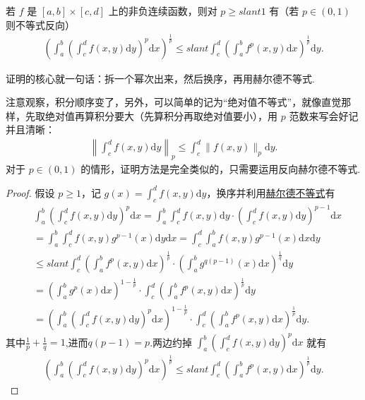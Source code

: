 \documentclass[../../main.tex]{subfiles}
\begin{document}
\begin{theorem}[Minkowski不等式]\label{theorem:Minkowski(闵可夫斯基)不等式}
若 $f$ 是 $[a,b] \times [c,d]$ 上的非负连续函数，则对 $p \geqslant slant 1$ 有（若 $p \in (0,1)$ 则不等式反向）
\begin{align*}
\left( \int_a^b \left( \int_c^d f(x,y) \mathrm{d}y \right)^p \mathrm{d}x \right)^{\frac{1}{p}} \leqslant slant \int_c^d \left( \int_a^b f^p(x,y) \mathrm{d}x \right)^{\frac{1}{p}} \mathrm{d}y.
\end{align*}
\end{theorem}
\begin{note}
证明的核心就一句话：拆一个幂次出来，然后换序，再用赫尔德不等式.
\end{note}
\begin{remark}
注意观察，积分顺序变了，另外，可以简单的记为“绝对值不等式”，就像直觉那样，先取绝对值再算积分要大（先算积分再取绝对值要小），用 $p$ 范数来写会好记并且清晰：
\begin{align*}
\left\| \int_c^d f(x,y) \mathrm{d}y \right\|_p \leqslant  \int_c^d \|f(x,y)\|_p \mathrm{d}y.
\end{align*}
对于 $p \in (0,1)$ 的情形，证明方法是完全类似的，只需要运用反向赫尔德不等式.
\end{remark}
\begin{proof}
假设 $p \geqslant  1$，记 $g(x) = \int_c^d f(x,y) \mathrm{d}y$，换序并利用\hyperref[theorem:Hold(赫尔德)不等式(积分形式)]{赫尔德不等式}有
\begin{align*}
&\int_a^b \left( \int_c^d f(x,y) \mathrm{d}y \right)^p \mathrm{d}x = \int_a^b \int_c^d f(x,y) \mathrm{d}y \cdot \left( \int_c^d f(x,y) \mathrm{d}y \right)^{p-1} \mathrm{d}x
\\
&= \int_a^b \int_c^d f(x,y) g^{p-1}(x) \mathrm{d}y \mathrm{d}x = \int_c^d \int_a^b f(x,y) g^{p-1}(x) \mathrm{d}x \mathrm{d}y
\\
&\leqslant slant \int_c^d \left( \int_a^b f^p(x,y) \mathrm{d}x \right)^{\frac{1}{p}} \cdot \left( \int_a^b g^{q(p-1)}(x) \mathrm{d}x \right)^{\frac{1}{q}} \mathrm{d}y
\\
&= \left( \int_a^b g^p(x) \mathrm{d}x \right)^{1-\frac{1}{p}} \cdot \int_c^d \left( \int_a^b f^p(x,y) \mathrm{d}x \right)^{\frac{1}{p}} \mathrm{d}y
\\
&= \left( \int_a^b \left( \int_c^d f(x,y) \mathrm{d}y \right)^p \mathrm{d}x \right)^{1-\frac{1}{p}} \cdot \int_c^d \left( \int_a^b f^p(x,y) \mathrm{d}x \right)^{\frac{1}{p}} \mathrm{d}y.
\end{align*}
其中$\frac{1}{p}+\frac{1}{q}=1$,进而$q(p-1)=p$.两边约掉 $\int_a^b \left( \int_c^d f(x,y) \mathrm{d}y \right)^p \mathrm{d}x$ 就有
\begin{align*}
\left( \int_a^b \left( \int_c^d f(x,y) \mathrm{d}y \right)^p \mathrm{d}x \right)^{\frac{1}{p}} \leqslant slant \int_c^d \left( \int_a^b f^p(x,y) \mathrm{d}x \right)^{\frac{1}{p}} \mathrm{d}y.
\end{align*}
\end{proof}
\end{document}
